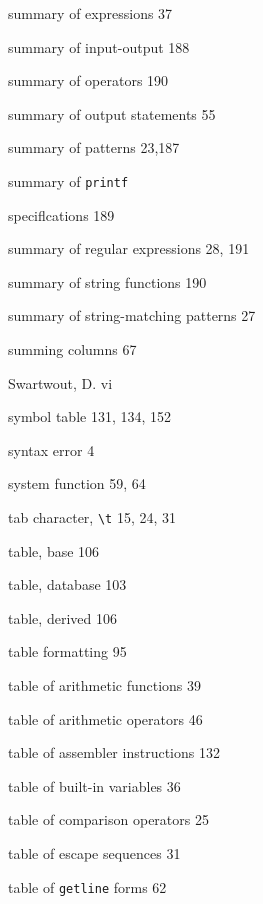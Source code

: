 \begin{multicols}{3}
\hangindent=3pc  summary of expressions 37

\hangindent=3pc  summary of input-output 188

\hangindent=3pc  summary of operators 190

\hangindent=3pc  summary of output statements 55

\hangindent=3pc  summary of patterns 23,187

\hangindent=3pc  summary of \verb'printf'

\hangindent=3pc  speciflcations 189

\hangindent=3pc  summary of regular expressions 28, 191

\hangindent=3pc  summary of string functions 190

\hangindent=3pc  summary of string-matching patterns 27

\hangindent=3pc  summing columns 67

\hangindent=3pc  Swartwout, D. vi

\hangindent=3pc  symbol table 131, 134, 152

\hangindent=3pc  syntax error 4

\hangindent=3pc  system function 59, 64

\hangindent=3pc  tab character, \verb'\t' 15, 24, 31

\hangindent=3pc  table, base 106

\hangindent=3pc  table, database 103

\hangindent=3pc  table, derived 106

\hangindent=3pc  table formatting 95

\hangindent=3pc  table of arithmetic functions 39

\hangindent=3pc  table of arithmetic operators 46

\hangindent=3pc  table of assembler instructions 132

\hangindent=3pc  table of built-in variables 36

\hangindent=3pc  table of comparison operators 25

\hangindent=3pc  table of escape sequences 31

\hangindent=3pc  table of \verb'getline' forms 62


\end{multicols}
